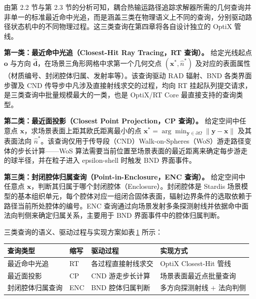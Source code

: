 由第 2.2 节与第 2.3 节的分析可知，耦合热输运路径追踪求解器所需的几何查询并非单一的标准最近命中光追，而是涵盖三类在物理语义上不同的查询，分别驱动路径状态机中的不同物理过程。这三类查询在第四章将各自设计独立的 OptiX 管线。

\textbf{第一类：最近命中光追（Closest-Hit Ray Tracing，RT 查询）。} 给定光线起点 $\mathbf{o}$ 与方向 $\hat{\mathbf{d}}$，在场景三角形网格中求第一个几何交点 $(\mathbf{x}^*, \hat{n}^*)$ 及对应的表面属性（材质编号、封闭腔体归属、发射率等）。该查询驱动 RAD 辐射、BND 各类界面步骤及 CND 传导步中凡涉及直接射线求交的过程，均向 RT 挂起队列提交请求，是三类查询中批量规模最大的一类，也是 OptiX/RT Core 最直接支持的查询类型。

\textbf{第二类：最近面投影（Closest Point Projection，CP 查询）。} 给定空间中任意点 $\mathbf{x}$，求场景表面上距其欧氏距离最小的点 $\mathbf{x}^* = \arg\min_{\mathbf{y} \in \partial\Omega}\|\mathbf{y} - \mathbf{x}\|$ 及其表面法向 $\hat{n}^*$。该查询仅用于传导段（CND）Walk-on-Spheres（WoS）游走路径变体的步长计算——WoS 算法需要当前位置至场景表面的最近距离来确定每步游走的球半径，并在粒子进入 epsilon-shell 时触发 BND 界面事件。

\textbf{第三类：封闭腔体归属查询（Point-in-Enclosure，ENC 查询）。} 给定空间中任意点 $\mathbf{x}$，判断其归属于哪个封闭腔体（Enclosure）。封闭腔体是 Stardis 场景模型的基本组织单元，每个腔体对应一组闭合固体表面，辐射边界条件的选取依赖于路径当前所处腔体的编号。ENC 查询通过向场景发射多条探测射线并依据命中面法向判侧来确定归属关系，主要用于 BND 界面事件中的腔体归属判断。

三类查询的语义、驱动过程与实现方案如表\,\ref{tab:query_types} 所示：

\begin{table}[htbp]
    \centering
    \label{tab:query_types}
    \begin{tabular}{llll}
        \toprule
        查询类型 & 缩写 & 驱动过程 & 实现方式 \\
        \midrule
        最近命中光追 & RT & 各过程直接射线求交 & OptiX Closest-Hit 管线 \\
        最近面投影 & CP & CND 游走步长计算 & 场景表面最近点批量查询 \\
        封闭腔体归属查询 & ENC & BND 腔体归属判断 & 多方向探测射线 $+$ 法向判侧 \\
        \bottomrule
    \end{tabular}
\end{table}

